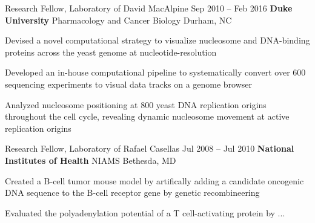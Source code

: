 
\begin{resentries}

  \resentry
    {Research Fellow, Laboratory of David MacAlpine}
    {Sep 2010 -- Feb 2016}
    {\textbf{Duke University} \xspace \bullet \xspace \xspace Pharmacology and Cancer Biology} %
    {Durham, NC} %
    {
      \begin{cvitems} %
        \item{Devised a novel computational strategy to visualize nucleosome and DNA-binding proteins across the yeast genome at nucleotide-resolution}
        \item{Developed an in-house computational pipeline to systematically convert over 600 sequencing experiments to visual data tracks on a genome browser}
        \item{Analyzed nucleosome positioning at 800 yeast DNA replication origins throughout the cell cycle, revealing dynamic nucleosome movement at active replication origins}
      \end{cvitems}
    }

  \resentry
    {Research Fellow, Laboratory of Rafael Casellas}
    {Jul 2008 -- Jul 2010}
    {\textbf{National Institutes of Health} \xspace \bullet \xspace \xspace NIAMS}
    {Bethesda, MD}
    {
      \begin{cvitems} %
        \item{Created a B-cell tumor mouse model by artifically adding a candidate oncogenic DNA sequence to the B-cell receptor gene by genetic recombineering}
        \item{Evaluated the polyadenylation potential of a T cell-activating protein by ...}
      \end{cvitems}
    }

\end{resentries}
